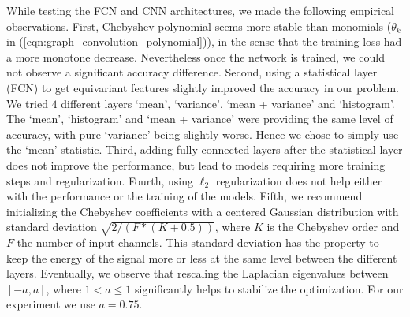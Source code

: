 \documentclass[final,twocolumn,3p,times,authoryear]{elsarticle}
\newcommand{\nati}[1]{{\color[rgb]{.1,.6,.1}{#1}}}
\newcommand{\eqnref}[1]{(\ref{eqn:#1})}
\newcommand{\1}{\b{1}}              %
\newcommand{\0}{\b{0}}              %
\begin{document}
\nati{Michael: I am highly uncertain of what should be kept in the following paragraph. Maybe the full paragraph should be left out!}
While testing the FCN and CNN architectures, we made the following empirical observations.
First, Chebyshev polynomial seems more stable than monomials ($\theta_k$ in \eqnref{graph_convolution_polynomial}), in the sense that the training loss had a more monotone decrease.
Nevertheless once the network is trained, we could not observe a significant accuracy difference.
Second, using a statistical layer (FCN) to get equivariant features slightly improved the accuracy in our problem.
We tried $4$ different layers `mean', `variance', `mean + variance' and `histogram'.
The `mean', `histogram' and `mean + variance' were providing the same level of accuracy, with pure `variance' being slightly worse. Hence we chose to simply use the `mean' statistic.
Third, adding fully connected layers after the statistical layer does not improve the performance, but lead to models requiring more training steps and regularization.
Fourth, using $\ell_2$ regularization does not help either with the performance or the training of the models.
Fifth, we recommend initializing the Chebyshev coefficients with a centered Gaussian distribution with standard deviation $\sqrt{2/(F * (K + 0.5))}$, where $K$ is the Chebyshev order and $F$ the number of input channels. This standard deviation has the property to keep the energy of the signal more or less at the same level between the different layers.
Eventually, we observe that rescaling the Laplacian eigenvalues between $[-a,a]$, where $1<a\leq1$ significantly helps to stabilize the optimization. For our experiment we use $a=0.75$.
\end{document}
